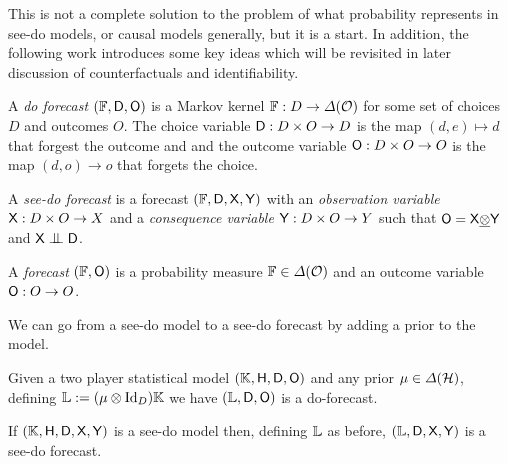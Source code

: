 This is not a complete solution to the problem of what probability represents in see-do models, or causal models generally, but it is a start. In addition, the following work introduces some key ideas which will be revisited in later discussion of counterfactuals and identifiability.

\begin{definition}
A \emph{do forecast} $(\mathbb{F},\mathsf{D},\mathsf{O})$ is a Markov kernel $\mathbb{F}:D\to \Delta(\mathcal{O})$ for some set of choices $D$ and outcomes $O$. The choice variable $\mathsf{D}:D\times O\to D$ is the map $(d,e)\mapsto d$ that forgest the outcome and and the outcome variable $\mathsf{O}:D\times O\to O$ is the map $(d,o)\to o$ that forgets the choice.

A \emph{see-do forecast} is a forecast $(\mathbb{F},\mathsf{D},\mathsf{X},\mathsf{Y})$ with an \emph{observation variable} $\mathsf{X}:D\times O\to X$ and a \emph{consequence variable} $\mathsf{Y}:D\times O\to Y$ such that $\mathsf{O}=\mathsf{X}\underline{\otimes}\mathsf{Y}$ and $\RV{X}\CI\RV{D}$.

A \emph{forecast} $(\mathbb{F},\mathsf{O})$ is a probability measure $\mathbb{F}\in\Delta(\mathcal{O})$ and an outcome variable $\mathsf{O}:O\to O$.
\end{definition}

We can go from a see-do model to a see-do forecast by adding a prior to the model.

\begin{theorem}
Given a two player statistical model $(\mathbb{K},\mathsf{H},\mathsf{D},\mathsf{O})$ and any prior $\mu\in \Delta(\mathcal{H})$, defining $\mathbb{L}:=(\mu\otimes \mathrm{Id}_D)\mathbb{K}$ we have $(\mathbb{L},\mathsf{D},\mathsf{O})$ is a do-forecast. 

If $(\mathbb{K},\mathsf{H},\mathsf{D},\mathsf{X},\mathsf{Y})$ is a see-do model then, defining $\mathbb{L}$ as before, $(\mathbb{L},\mathsf{D},\mathsf{X},\mathsf{Y})$ is a see-do forecast.


\end{theorem}


